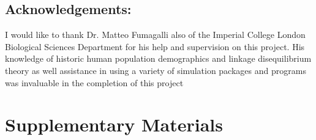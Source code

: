 \documentclass[11pt]{article}
\begin{document}
\begin{linenumbers}
\section{Acknowledgements:}
I would like to thank Dr. Matteo Fumagalli also of the Imperial College London Biological Sciences Department for his help and supervision on this project. His knowledge of historic human population demographics and linkage disequilibrium theory as well assistance in using a variety of simulation packages and programs was invaluable in the completion of this project 

\end{linenumbers}

\newpage


\newpage
\section{Supplementary Materials}
\end{document}
